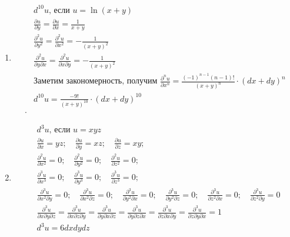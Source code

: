 \documentclass[a4paper, 12pt]{article}
\begin{document}
\begin{enumerate}
    \item %
    \begin{align*}
      &d^{10}u \text {, если } u = \ln(x+y) \\
      &\frac{\partial u}{\partial y} = \frac{\partial u}{\partial x} = \frac{1}{x+y} \\
      &\frac{\partial^2 u}{\partial y^2} = \frac{\partial^2 u}{\partial x^2} = -\frac{1}{(x+y)^2} \\
      &\frac{\partial^2 u}{\partial y \partial x} = \frac{\partial^2 u}{\partial x \partial y} = -\frac{1}{(x+y)^2} \\
      &\text{Заметим закономерность, получим } \frac{\partial^n u}{\partial x^n} =
      \frac{(-1)^{n-1} (n-1)!}{(x+y)^n}\cdot (dx+dy)^{n} \\
      &d^{10}u = \frac{- 9!}{(x+y)^{10}}\cdot (dx+dy)^{10} \\
    .\end{align*}
    
    \item %
    \begin{align*}
     &d^3u \text{, если } u = xyz \\
     &\frac{\partial u}{\partial x} = yz;\quad
     \frac{\partial u}{\partial y} = xz;\quad
     \frac{\partial u}{\partial z} = xy; \\
     &\frac{\partial^2 u}{\partial x^2} = 0;\quad
     \frac{\partial^2 u}{\partial y^2} = 0;\quad
     \frac{\partial^2 u}{\partial z^2} = 0; \\     
     &\frac{\partial^3 u}{\partial x^3} = 0;\quad
     \frac{\partial^3 u}{\partial y^3} = 0;\quad
     \frac{\partial^3 u}{\partial z^3} = 0; \\
     &\frac{\partial^3 u}{\partial x^2 \partial y} = 0;\quad
     \frac{\partial^3 u}{\partial x^2 \partial z} = 0;\quad
     \frac{\partial^3 u}{\partial y^2 \partial x} = 0;\quad
     \frac{\partial^3 u}{\partial y^2 \partial z} = 0;\quad
     \frac{\partial^3 u}{\partial z^2 \partial x} = 0;\quad
     \frac{\partial^3 u}{\partial z^2 \partial y} = 0 \\
     &\frac{\partial^3 u}{\partial x \partial y \partial z}
     =\frac{\partial^3 u}{\partial x \partial z \partial y}
     =\frac{\partial^3 u}{\partial y \partial x \partial z}
     =\frac{\partial^3 u}{\partial y \partial z \partial x}
     =\frac{\partial^3 u}{\partial z \partial x \partial y}
     =\frac{\partial^3 u}{\partial z \partial y \partial x}
     = 1 \\
     &d^3u = 6dxdydz
    \end{align*}
    

\end{enumerate}
\end{document}
